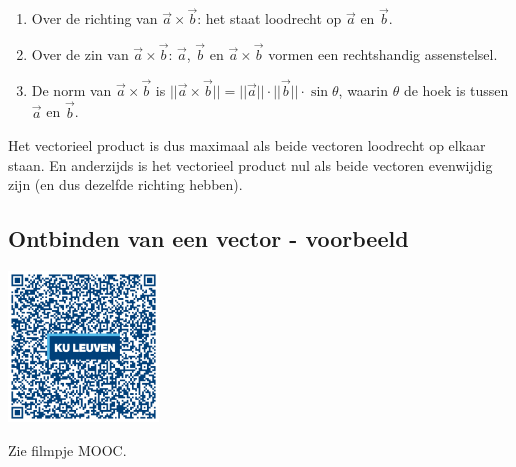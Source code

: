 \begin{enumerate}
	\item Over de richting van $\vec{a} \times \vec{b}$: het staat loodrecht op $\vec{a}$ en $\vec{b}$.
	\item Over de zin van $\vec{a} \times \vec{b}$: $\vec{a}$, $\vec{b}$  en $\vec{a} \times \vec{b}$ vormen een rechtshandig assenstelsel.
	\item De norm van $\vec{a} \times \vec{b}$ is $||\vec{a} \times \vec{b}||=||\vec{a}||\cdot||\vec{b}||\cdot \sin \theta$, waarin $\theta$ de hoek is tussen $\vec{a}$ en $\vec{b}$.
\end{enumerate}
Het vectorieel product is dus maximaal als beide vectoren loodrecht op elkaar staan. En anderzijds is het vectorieel product nul als beide vectoren evenwijdig zijn (en dus dezelfde richting hebben).

\subsection{Ontbinden van een vector - voorbeeld}
\begin{minipage}{.25\linewidth}
	\raggedright
	\includegraphics[width=4cm]{1_elem_rekenvaardigheden_A/inputs/QR_Code_ONTBINDEN_module_1new}
\end{minipage}
\begin{minipage}{.7\linewidth}
	Zie filmpje MOOC.
\end{minipage}

